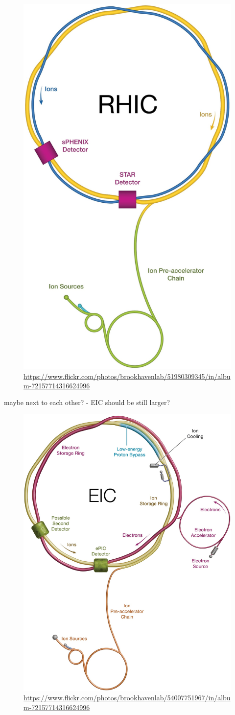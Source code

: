 \begin{figure}[H]
    \centering
    \includegraphics[width=.4\linewidth]{img/rhic.jpg}
    \caption{\url{https://www.flickr.com/photos/brookhavenlab/51980309345/in/album-72157714316624996}}
    \label{fig:eic:rhic}
\end{figure}
maybe next to each other? - EIC should be still larger?
\begin{figure}[H]
    \centering
    \includegraphics[width=.5\linewidth]{img/eic.jpg}
    \caption{\url{https://www.flickr.com/photos/brookhavenlab/54007751967/in/album-72157714316624996}}
    \label{fig:eic:eic}
\end{figure}

